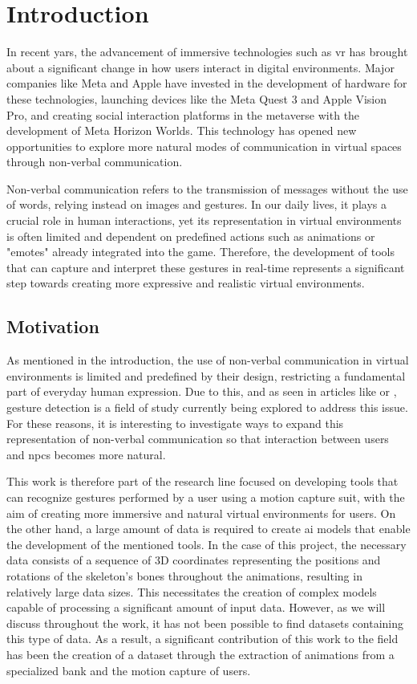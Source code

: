 \chapter*{Introduction}
\label{cap:introduction}

In recent yars, the advancement of immersive technologies such as \gls{vr} has brought about a significant change in how users interact in digital environments.
Major companies like Meta and Apple have invested in the development of hardware for these technologies, launching devices like the Meta Quest 3 and Apple Vision Pro, and creating social interaction platforms in the \gls{metaverse} with the development of Meta Horizon Worlds.
This technology has opened new opportunities to explore more natural modes of communication in virtual spaces through non-verbal communication.

Non-verbal communication refers to the transmission of messages without the use of words, relying instead on images and gestures.
In our daily lives, it plays a crucial role in human interactions, yet its representation in virtual environments is often limited and dependent on predefined actions such as animations or "emotes" already integrated into the game.
Therefore, the development of tools that can capture and interpret these gestures in real-time represents a significant step towards creating more expressive and realistic virtual environments.
\section{Motivation}


As mentioned in the introduction, the use of non-verbal communication in virtual environments is limited and predefined by their design, restricting a fundamental part of everyday human expression.
Due to this, and as seen in articles like \cite{Neverova} or \cite{VRHANDS}, gesture detection is a field of study currently being explored to address this issue.
For these reasons, it is interesting to investigate ways to expand this representation of non-verbal communication so that interaction between users and \glspl{npc} becomes more natural.

This work is therefore part of the research line focused on developing tools that can recognize gestures performed by a user using a motion capture suit, with the aim of creating more immersive and natural virtual environments for users.
On the other hand, a large amount of data is required to create \gls{ai} models that enable the development of the mentioned tools.
In the case of this project, the necessary data consists of a sequence of 3D coordinates representing the positions and rotations of the skeleton's bones throughout the animations, resulting in relatively large data sizes.
This necessitates the creation of complex models capable of processing a significant amount of input data. However, as we will discuss throughout the work, it has not been possible to find datasets containing this type of data.
As a result, a significant contribution of this work to the field has been the creation of a dataset through the extraction of animations from a specialized bank and the motion capture of users.

